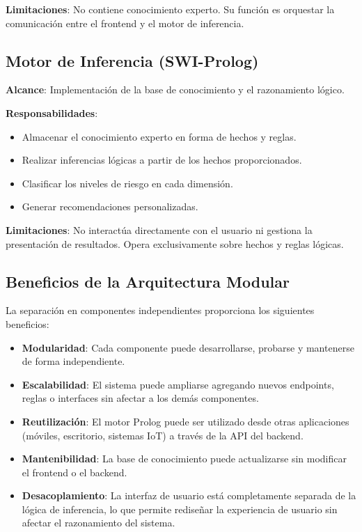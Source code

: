 \documentclass[12pt, letterpaper]{article}
\begin{document}
\textbf{Limitaciones}: No contiene conocimiento experto. Su función es orquestar la comunicación entre el frontend y el motor de inferencia.

\subsection{Motor de Inferencia (SWI-Prolog)}

\textbf{Alcance}: Implementación de la base de conocimiento y el razonamiento lógico.

\textbf{Responsabilidades}:
\begin{itemize}
  \item Almacenar el conocimiento experto en forma de hechos y reglas.
  \item Realizar inferencias lógicas a partir de los hechos proporcionados.
  \item Clasificar los niveles de riesgo en cada dimensión.
  \item Generar recomendaciones personalizadas.
\end{itemize}

\textbf{Limitaciones}: No interactúa directamente con el usuario ni gestiona la presentación de resultados. Opera exclusivamente sobre hechos y reglas lógicas.

\subsection{Beneficios de la Arquitectura Modular}

La separación en componentes independientes proporciona los siguientes beneficios:

\begin{itemize}
  \item \textbf{Modularidad}: Cada componente puede desarrollarse, probarse y mantenerse de forma independiente.
  \item \textbf{Escalabilidad}: El sistema puede ampliarse agregando nuevos endpoints, reglas o interfaces sin afectar a los demás componentes.
  \item \textbf{Reutilización}: El motor Prolog puede ser utilizado desde otras aplicaciones (móviles, escritorio, sistemas IoT) a través de la API del backend.
  \item \textbf{Mantenibilidad}: La base de conocimiento puede actualizarse sin modificar el frontend o el backend.
  \item \textbf{Desacoplamiento}: La interfaz de usuario está completamente separada de la lógica de inferencia, lo que permite rediseñar la experiencia de usuario sin afectar el razonamiento del sistema.
\end{itemize}
\end{document}
